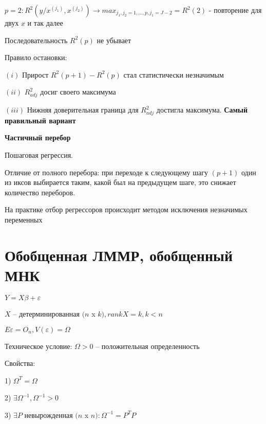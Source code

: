 \documentclass{article}
\begin{document}
$p = 2: R^2(y/x^{(j_1)}, x^{(j_2)}) \longrightarrow max_{j_1, j_2=1,...,p, j_1 = J-2}  = R^2(2)$ - повторение для двух $x$ и так далее\par

\vspace{1mm}
Последовательность $R^2(p)$ не убывает\par

\vspace{1mm}
Правило остановки:\par
$(i)$ Прирост $R^2(p+1) - R^2(p)$ стал статистически незначимым\par
$(ii)$ $R^2_{adj}$ досиг своего максимума\par
$(iii)$ Нижняя доверительная граница для $R^2_{adj}$ достигла максимума. \textbf{Самый правильный вариант}\par

\vspace{2mm}
\textbf{Частичный перебор} \par
Пошаговая регрессия. \par
Отличие от полного перебора: при переходе к следующему шагу $(p+1)$ один из иксов выбирается таким, какой был на предыдущем шаге, это снижает количество переборов.\par

\vspace{1mm}
На практике отбор регрессоров происходит методом исключения незначимых переменных\par


\section{Обобщенная ЛММР, обобщенный МНК}

 $Y = X \beta + \varepsilon$ \par
$X$ -- детерминированная $(n$ x $k), rank X = k, k<n$\par
$E\varepsilon = O_n, V(\varepsilon) = \Omega$\par
Техническое условие: $\Omega > 0$ -- положительная определенность\par

\vspace{1mm}
Свойства:\par
1) $\Omega^T = \Omega$\par\par
2) $\exists \Omega^{-1}, \Omega^{-1} > 0$\par
3) $\exists P$ невырожденная $(n$ x $n): \Omega^{-1} = P^TP$\par
\end{document}
